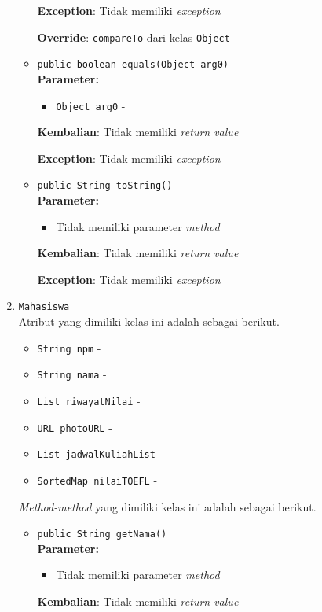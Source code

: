 \documentclass{article}
\begin{document}
\begin{enumerate}
\begin{itemize}
\textbf{Exception}: Tidak memiliki \textit{exception}

\textbf{Override}: \texttt{compareTo} dari kelas \texttt{Object}

\item \texttt{public boolean equals(Object arg0)}\\ 


\textbf{Parameter:}\begin{itemize}
\item \texttt{Object arg0} - 
\end{itemize}
\textbf{Kembalian}: Tidak memiliki \textit{return value}

\textbf{Exception}: Tidak memiliki \textit{exception}

\item \texttt{public String toString()}\\ 


\textbf{Parameter:}\begin{itemize}
\item Tidak memiliki parameter \textit{method}
\end{itemize}
\textbf{Kembalian}: Tidak memiliki \textit{return value}

\textbf{Exception}: Tidak memiliki \textit{exception}

\end{itemize}
\item \texttt{Mahasiswa}\\ 
Atribut yang dimiliki kelas ini adalah sebagai berikut.
\begin{itemize}
\item \texttt{String npm} - 
\item \texttt{String nama} - 
\item \texttt{List riwayatNilai} - 
\item \texttt{URL photoURL} - 
\item \texttt{List jadwalKuliahList} - 
\item \texttt{SortedMap nilaiTOEFL} - 
\end{itemize}
\textit{Method-method} yang dimiliki kelas ini adalah sebagai berikut.
\begin{itemize}
\item \texttt{public String getNama()}\\ 


\textbf{Parameter:}\begin{itemize}
\item Tidak memiliki parameter \textit{method}
\end{itemize}
\textbf{Kembalian}: Tidak memiliki \textit{return value}


\end{itemize}
\end{enumerate}
\end{document}
